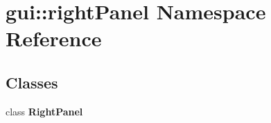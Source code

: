 \section{gui::rightPanel Namespace Reference}
\label{namespacegui_1_1rightPanel}


\subsection*{Classes}
\begin{CompactItemize}
\item 
class {\bf RightPanel}
\end{CompactItemize}
